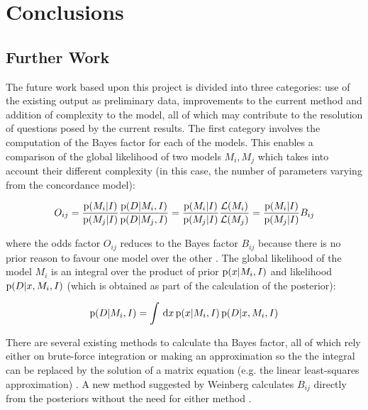 \chapter{Conclusions}
\label{ch:conclusions}

\section{Further Work}
\label{sec:6.1}

The future work based upon this project is divided into three categories: use of the existing output as preliminary data, improvements to the current method and addition of complexity to the model, all of which may contribute to the resolution of questions posed by the current results. The first category involves the computation of the Bayes factor for each of the models. This enables a comparison of the global likelihood of two models $M_i , M_j$ which takes into account their different complexity (in this case, the number of parameters varying from the concordance model):

\begin{equation}
    O_{ij} 
    = \frac{ \prob{M_{i}}[I] }{ \prob{M_{j}}[I] } \frac{ \prob{D}[M_{i},I] }{ \prob{D}[M_{j},I] }
    = \frac{ \prob{M_{i}}[I] }{ \prob{M_{j}}[I] } \frac{ \mathcal{L} (M_{i}) }{ \mathcal{L} (M_{j}) }
    = \frac{ \prob{M_{i}}[I] }{ \prob{M_{j}}[I] } B_{ij}
\label{eq:bayes-factor}
\end{equation}

where the odds factor $O_{ij}$ reduces to the Bayes factor $B_{ij}$ because there is no prior reason to favour one model over the other \cite{Gregory2005}. The global likelihood of the model $M_i$ is an integral over the product of prior $\prob{x}[M_i , I]$ and likelihood $\prob{D}[x, M_i , I]$ (which is obtained as part of the calculation of the posterior):

\begin{equation}
    \prob{D}[M_{i},I]
    = \int{} \dd{x} \prob{x}[M_{i},I] \prob{D}[x,M_{i},I]
\label{eq:model-likelihood-integral}
\end{equation}

There are several existing methods to calculate tha Bayes factor, all of which rely either on brute-force integration or making an approximation so the the integral can be replaced by the solution of a matrix equation (e.g. the linear least-squares approximation) \cite{Gregory2005}. A new method suggested by Weinberg calculates $B_{ij}$ directly from the posteriors without the need for either method \cite{Weinberg2009}.

